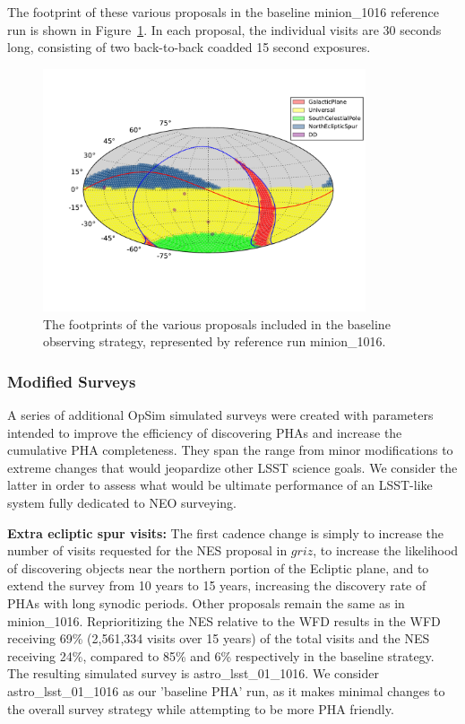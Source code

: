 The footprint of these various proposals in the baseline minion\_1016 reference run is shown in Figure~\ref{fig:minion_footprints}. In each proposal, the individual visits are 30 seconds long, consisting of two back-to-back coadded 15 second exposures.

\begin{figure}[t!]
\centering
\includegraphics[width=0.85\textwidth]{figures/minion_1016_proposal_footprint}
\vskip -1.0in
\caption{The footprints of the various proposals included in the baseline observing strategy, represented by reference run minion\_1016.
\label{fig:minion_footprints}}
\end{figure}


\subsubsection{Modified Surveys}

A series of additional OpSim simulated surveys were created with parameters intended to improve the efficiency of discovering PHAs and increase the cumulative PHA completeness. They span the range from minor modifications to extreme changes that would
jeopardize other LSST science goals. We consider the latter in order to assess what would be ultimate performance of an
LSST-like system fully dedicated to NEO surveying.

\textbf{Extra ecliptic spur visits:} The first cadence change is simply to increase the number of visits requested for the NES proposal in $griz$, to increase the likelihood of discovering objects near the northern portion of the Ecliptic plane, and to extend the survey from 10 years to 15 years, increasing the discovery rate of PHAs with long synodic periods. Other proposals remain the same as in minion\_1016. Reprioritizing the NES relative to the WFD results in the WFD receiving 69\% (2,561,334 visits over 15 years) of the total visits and the NES receiving 24\%, compared to 85\% and 6\% respectively in the baseline strategy. The resulting simulated survey is astro\_lsst\_01\_1016.  We consider astro\_lsst\_01\_1016 as our 'baseline PHA' run, as it makes minimal changes to the overall survey strategy while attempting to be more PHA friendly.


